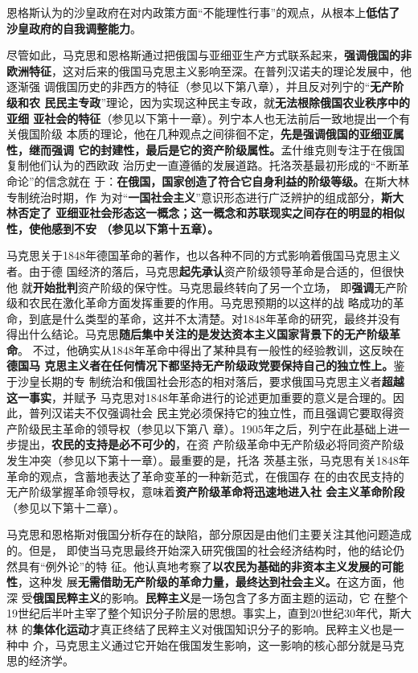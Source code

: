 恩格斯认为的沙皇政府在对内政策方面“不能理性行事”的观点，从根本上\textbf{低估了
  沙皇政府的自我调整能力}。

尽管如此，马克思和恩格斯通过把俄国与亚细亚生产方式联系起来，\textbf{强调俄国的非
  欧洲特征}，这对后来的俄国马克思主义影响至深。在普列汉诺夫的理论发展中，他逐渐强
调俄国历史的非西方的特征（参见以下第八章），并且反对列宁的“\textbf{无产阶级和农
  民民主专政}”理论，因为实现这种民主专政，就\textbf{无法根除俄国农业秩序中的亚细
  亚社会的特征}（参见以下第十一章）。列宁本人也无法前后一致地提出一个有关俄国阶级
本质的理论，他在几种观点之间徘徊不定，\textbf{先是强调俄国的亚细亚属性，继而强调
  它的封建性，最后是它的资产阶级属性。}孟什维克则专注于在俄国复制他们认为的西欧政
治历史一直遵循的发展道路。托洛茨基最初形成的“不断革命论”的信念就在
于：\textbf{在俄国，国家创造了符合它自身利益的阶级等级。}在斯大林专制统治时期，作
为对“\textbf{一国社会主义}”意识形态进行广泛辨护的组成部分，\textbf{斯大林否定了
  亚细亚社会形态这一概念；这一概念和苏联现实之间存在的明显的相似性，使他感到不安
  （参见以下第十五章）。}

马克思关于1848年德国革命的著作，也以各种不同的方式影响着俄国马克思主义者。由于德
国经济的落后，马克思\textbf{起先承认}资产阶级领导革命是合适的，但很快他
就\textbf{开始批判}资产阶级的保守性。马克思最终转向了另一个立场，
即\textbf{强调}无产阶级和农民在激化革命方面发挥重要的作用。马克思预期的以这样的战
略成功的革命，到底是什么类型的革命，这并不太清楚。对1848年革命的研究，最终并没有
得出什么结论。马克思\textbf{随后集中关注的是发达资本主义国家背景下的无产阶级革命}。
不过，他确实从1848年革命中得出了某种具有一般性的经验教训，这反映在\textbf{德国马
  克思主义者在任何情况下都坚持无产阶级政党要保持自己的独立性上。}鉴于沙皇长期的专
制统治和俄国社会形态的相对落后，要求俄国马克思主义者\textbf{超越这一事实}，并赋予
马克思对1848年革命进行的论述更加重要的意义是合理的。因此，普列汉诺夫不仅强调社会
民主党必须保持它的独立性，而且强调它要取得资产阶级民主革命的领导权（参见以下第八
章）。1905年之后，列宁在此基础上进一步提出，\textbf{农民的支持是必不可少的}，在资
产阶级革命中无产阶级必将同资产阶级发生冲突（参见以下第十一章）。最重要的是，托洛
茨基主张，马克思有关1848年革命的观点，含蓄地表达了革命变革的一种新范式，在俄国存
在的由农民支持的无产阶级掌握革命领导权，意味着\textbf{资产阶级革命将迅速地进入社
  会主义革命阶段}（参见以下第十二章）。

马克思和恩格斯对俄国分析存在的缺陷，部分原因是由他们主要关注其他问题造成的。但是，
即使当马克思最终开始深入研究俄国的社会经济结构时，他的结论仍然具有“例外论”的特
征。他认真地考察了\textbf{以农民为基础的非资本主义发展的可能性}，这种发
展\textbf{无需借助无产阶级的革命力量，最终达到社会主义。}在这方面，他深
受\textbf{俄国民粹主义}的影响。\textbf{民粹主义}是一场包含了多方面主题的运动，它
在整个19世纪后半叶主宰了整个知识分子阶层的思想。事实上，直到20世纪30年代，斯大林
的\textbf{集体化运动}才真正终结了民粹主义对俄国知识分子的影响。民粹主义也是一种中
介，马克思主义通过它开始在俄国发生影响，这一影响的核心部分就是马克思的经济学。

